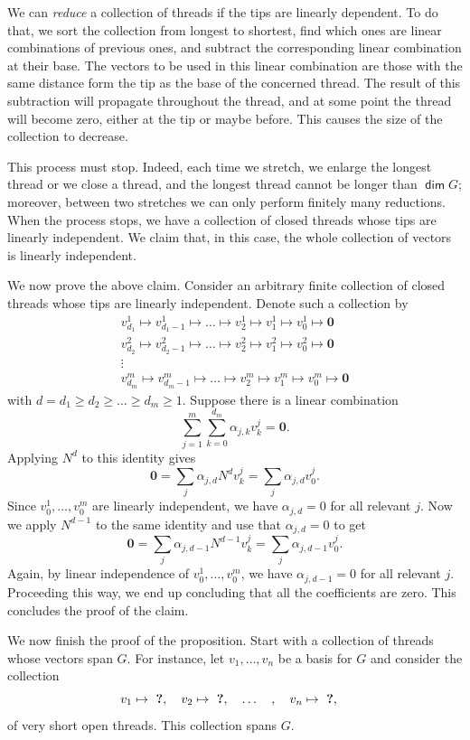 \documentclass[12pt]{article}
\newcommand{\1}{\mathbf{1}}
\newcommand{\0}{\mathbf{0}}
\DeclareMathOperator{\mydim}{\mathsf{dim}}
\renewcommand{\geq}{\geqslant}
\theoremstyle{definition}
\begin{document}
We can \emph{reduce} a collection of threads if the tips are linearly dependent. To do that, we sort the collection from longest to shortest, find which ones are linear combinations of previous ones, and subtract the corresponding linear combination at their base.
The vectors to be used in this linear combination are those with the same distance form the tip as the base of the concerned thread. The result of this subtraction will propagate throughout the thread, and at some point the thread will become zero, either at the tip or maybe before. This causes the size of the collection to decrease.

This process must stop.
Indeed, each time we stretch, we enlarge the longest thread or we close a thread, and the longest thread cannot be longer than $\mydim G$; moreover, between two stretches we can only perform finitely many reductions.
When the process stops, we have a collection of closed threads whose tips are linearly independent.
We claim that, in this case, the whole collection of vectors is linearly independent.

We now prove the above claim.
Consider an arbitrary finite collection of closed threads whose tips are linearly independent.
Denote such a collection by
\[
\begin{gathered}
v^1_{d_1} \mapsto v^1_{d_1-1} \mapsto \dots \mapsto v^1_2 \mapsto v^1_1 \mapsto v^1_0 \mapsto \0
\\
v^2_{d_2} \mapsto v^2_{d_2-1} \mapsto \dots \mapsto v^2_2 \mapsto v^2_1 \mapsto v^2_0 \mapsto \0
\\
\vdots
\\
v^m_{d_m} \mapsto v^m_{d_m-1} \mapsto \dots \mapsto v^m_2 \mapsto v^m_1 \mapsto v^m_0 \mapsto \0
\end{gathered}
\]
with $d = d_1 \geq d_2 \geq \dots \geq d_m \geq 1$.
Suppose there is a linear combination
$$\sum_{j=1}^m \sum_{k=0}^{d_m} \alpha_{j,k} v^j_k = \0.$$
Applying $N^{d}$ to this identity gives
$$\0 = \sum_{j} \alpha_{j,d} N^{d} v^j_k = \sum_j \alpha_{j,d} v^j_0.$$
Since $v^1_0,\dots,v^m_0$ are linearly independent, we have $\alpha_{j,d} = 0$ for all relevant $j$.
Now we apply $N^{d-1}$ to the same identity and use that $\alpha_{j,d} = 0$ to get
$$\0 = \sum_{j} \alpha_{j,d-1} N^{d-1} v^j_k = \sum_j \alpha_{j,d-1} v^j_0.$$
Again, by linear independence of $v^1_0,\dots,v^m_0$, we have $\alpha_{j,d-1} = 0$ for all relevant $j$.
Proceeding this way, we end up concluding that all the coefficients are zero.
This concludes the proof of the claim.

We now finish the proof of the proposition.
Start with a collection of threads whose vectors span $G$.
For instance, let $v_1,\dots,v_n$ be a basis for $G$ and consider the collection
\[
v_1 \mapsto \text{ \bf ?}
,\ \ \
v_2 \mapsto \text{ \bf ?}
,\ \ \
\dots \ \ \
,\ \ \
v_n \mapsto \text{ \bf ?}
,\ \ \
\]
of very short open threads.
This collection spans $G$.
\end{document}
